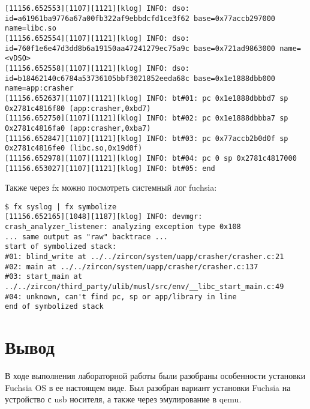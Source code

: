 \documentclass[14pt,a4paper]{article}
\begin{document}
\begin{lstlisting}
[11156.652553][1107][1121][klog] INFO: dso: id=a61961ba9776a67a00fb322af9ebbdcfd1ce3f62 base=0x77accb297000 name=libc.so
[11156.652554][1107][1121][klog] INFO: dso: id=760f1e6e47d3dd8b6a19150aa47241279ec75a9c base=0x721ad9863000 name=<vDSO>
[11156.652558][1107][1121][klog] INFO: dso: id=b18462140c6784a53736105bbf3021852eeda68c base=0x1e1888dbb000 name=app:crasher
[11156.652637][1107][1121][klog] INFO: bt#01: pc 0x1e1888dbbbd7 sp 0x2781c4816f80 (app:crasher,0xbd7)
[11156.652750][1107][1121][klog] INFO: bt#02: pc 0x1e1888dbbba7 sp 0x2781c4816fa0 (app:crasher,0xba7)
[11156.652847][1107][1121][klog] INFO: bt#03: pc 0x77accb2b0d0f sp 0x2781c4816fe0 (libc.so,0x19d0f)
[11156.652978][1107][1121][klog] INFO: bt#04: pc 0 sp 0x2781c4817000
[11156.653027][1107][1121][klog] INFO: bt#05: end
\end{lstlisting}

Также через fx можно посмотреть системный лог fuchsia: 

\begin{lstlisting}
$ fx syslog | fx symbolize
[11156.652165][1048][1187][klog] INFO: devmgr: crash_analyzer_listener: analyzing exception type 0x108
... same output as "raw" backtrace ...
start of symbolized stack:
#01: blind_write at ../../zircon/system/uapp/crasher/crasher.c:21
#02: main at ../../zircon/system/uapp/crasher/crasher.c:137
#03: start_main at ../../zircon/third_party/ulib/musl/src/env/__libc_start_main.c:49
#04: unknown, can't find pc, sp or app/library in line
end of symbolized stack
\end{lstlisting}



\section{Вывод}
    В ходе выполнения лабораторной работы были разобраны особенности установки Fuchsia OS в ее настоящем виде. Был разобран вариант установки Fuchsia на устройство с usb носителя, а также через эмулирование в qemu. 
\end{document}
